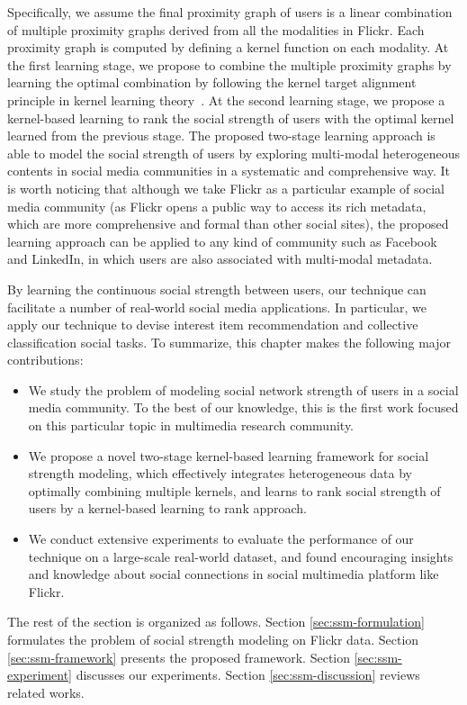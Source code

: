 Specifically, we assume the final proximity graph of users is a linear combination of multiple proximity graphs derived from all the modalities in Flickr. Each proximity graph is computed by defining a kernel function on each modality. At the first learning stage, we propose to combine the multiple proximity graphs by learning the optimal combination by following the kernel target alignment principle in kernel learning theory~\cite{icml/CortesMR10,nips/CristianiniSEK01}. At
the second learning stage, we propose a kernel-based learning to rank the social strength of users with the optimal kernel learned from the previous stage. The
proposed two-stage learning approach is able to model the social strength of users by exploring multi-modal heterogeneous contents in social media communities in a systematic and comprehensive way. It is worth noticing that although we take Flickr as a particular example of social media community (as Flickr opens a public way to access its rich metadata, which are more comprehensive and formal than other social sites), the proposed learning approach can be applied to any kind of community such as Facebook and LinkedIn, in which users are also associated with multi-modal metadata.

By learning the continuous social strength between users, our technique can facilitate a number of real-world social media applications. In particular, we apply our technique to devise interest item recommendation and collective classification social tasks. To summarize, this chapter makes the following major
contributions:
\begin{itemize}
\item We study the problem of modeling social network strength of users in a social media community. To the best of our knowledge, this is the first work focused on this particular topic in multimedia research community.
\item We propose a novel two-stage kernel-based learning framework for social strength modeling, which effectively integrates heterogeneous data by optimally combining multiple kernels, and learns to rank social strength of users by a kernel-based learning to rank approach.
\item We conduct extensive experiments to evaluate the performance of our technique on a large-scale real-world dataset, and found encouraging insights and knowledge about social connections in social multimedia platform like Flickr.
\end{itemize}

The rest of the section is organized as follows. Section \ref{sec:ssm-formulation} formulates the problem of social strength modeling on Flickr data. Section \ref{sec:ssm-framework} presents the proposed framework. Section \ref{sec:ssm-experiment} discusses our experiments. Section \ref{sec:ssm-discussion} reviews related works.

